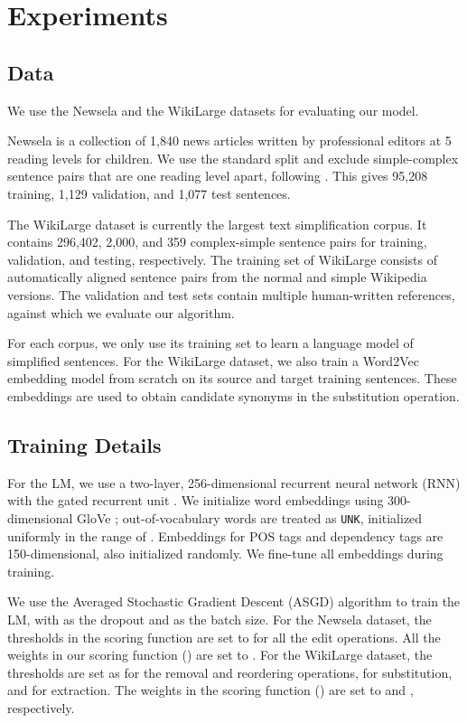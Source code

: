 \documentclass[11pt,a4paper]{article}
\begin{document}
\section{Experiments}

\subsection{Data}
\label{ssec:layout}

We use the Newsela \cite{xu2015problems} and the WikiLarge datasets \cite{zhang2017sentence} for evaluating our model. 

Newsela is a collection of 1,840 news articles written by professional editors at 5 reading levels for children.  We use the standard split and exclude simple-complex sentence pairs that are one reading level apart, following . 
This gives 95,208 training, 1,129 validation, and 1,077 test sentences. 

The WikiLarge dataset is currently the largest text simplification corpus. It contains 296,402, 2,000, and 359 complex-simple sentence pairs for training, validation, and testing, respectively. The training set of WikiLarge consists of automatically aligned sentence pairs from the normal and simple Wikipedia versions. The validation and test sets contain multiple human-written references, against which we evaluate our algorithm. 

For each corpus, we only use its training set to learn a language model of simplified sentences. {For the WikiLarge dataset,} we also train a Word2Vec embedding model from scratch on its source and target training sentences. These embeddings are used to obtain candidate synonyms in the substitution operation. 



\subsection{Training Details}

For the LM, we use a two-layer, 256-dimensional recurrent neural network (RNN) with the gated recurrent unit \cite[GRU,][]{chung2014empirical}.
We initialize word embeddings using 300-dimensional GloVe \cite{pennington2014glove}; out-of-vocabulary words are treated as \texttt{UNK}, initialized uniformly in the range of . Embeddings for POS tags and dependency tags are 150-dimensional, also initialized randomly. We fine-tune all embeddings during training.   


We use the Averaged Stochastic Gradient Descent (ASGD) algorithm \cite{polyak1992acceleration} to train the LM, with  as the dropout and  as the batch size. For the Newsela dataset, the thresholds  in the scoring function are set to  for all the edit operations. All the weights in our scoring function () are set to . For the WikiLarge dataset, the thresholds are set as  for the removal and reordering operations,  for substitution, and  for extraction. The weights in the scoring function () are set to  and , respectively.  
\end{document}
